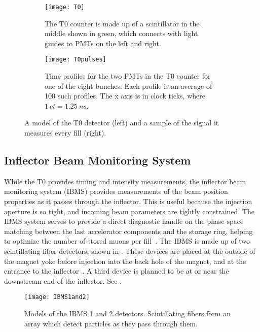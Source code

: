 \begin{figure}
\centering
    \begin{subfigure}[t]{0.45\textwidth}
        \centering
        \texttt{[image: T0]}
        \caption{The T0 counter is made up of a scintillator in the middle shown in green, which connects with light guides to PMTs on the left and right.}
    \label{fig:T0counter}
    \end{subfigure}%
    \hspace{1cm}
    \begin{subfigure}[t]{0.45\textwidth}
        \centering
        \texttt{[image: T0pulses]}
        \caption{Time profiles for the two PMTs in the T0 counter for one of the eight bunches. Each profile is an average of 100 such profiles. The x axis is in clock ticks, where $\SI{1}{ct} = \SI{1.25}{ns}$.}
    \label{fig:T0pulses}    
    \end{subfigure}
\caption[T0 counter and pulses]{A model of the T0 detector (left) and a sample of the signal it measures every fill (right).}
\label{fig:T0}
\end{figure}


\subsection{Inflector Beam Monitoring System}
\label{sec:IBMS}

While the T0 provides timing and intensity measurements, the inflector beam monitoring system (IBMS) provides measurements of the beam position properties as it passes through the inflector. This is useful because the injection aperture is so tight, and incoming beam parameters are tightly constrained. The IBMS system serves to provide a direct diagnostic handle on the phase space matching between the last accelerator components and the storage ring, helping to optimize the number of stored muons per fill~\cite{ibms1}. The IBMS is made up of two scintillating fiber detectors, shown in . These devices are placed at the outside of the magnet yoke before injection into the back hole of the magnet, and at the entrance to the inflector~\cite{ibms2}. A third device is planned to be at or near the downstream end of the inflector. See . 


\begin{figure}
    \centering
    \texttt{[image: IBMS1and2]}
    \caption[IBMS models]{Models of the IBMS 1 and 2 detectors. Scintillating fibers form an array which detect particles as they pass through them.}   
    \label{fig:IBMS1and2}
\end{figure}

